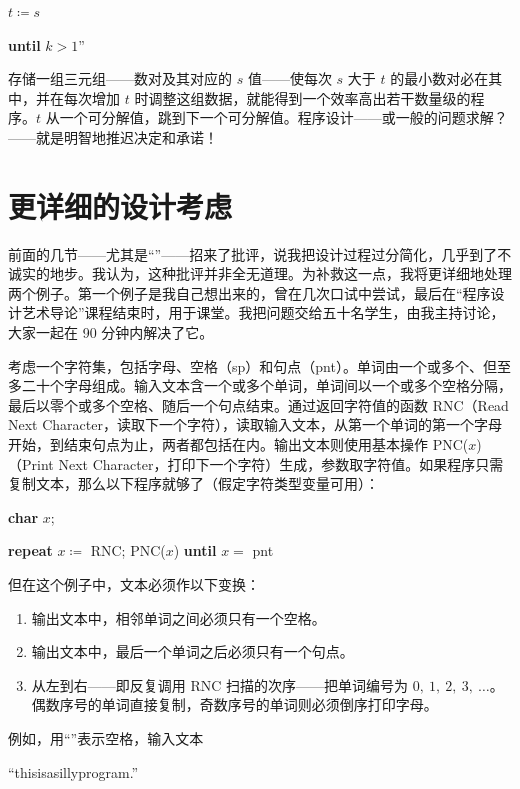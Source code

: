 \documentclass[twoside,11pt,fontset=none]{ctexbook}
\begin{document}
\quad \quad $t \coloneq s$

\quad \textbf{until} $k > 1$''

存储一组三元组——数对及其对应的 $s$ 值——使每次 $s$ 大于 $t$ 的最小数对必在其中，并在每次增加 $t$ 时调整这组数据，就能得到一个效率高出若干数量级的程序。$t$ 从一个可分解值，跳到下一个可分解值。程序设计——或一般的问题求解？——就是明智地推迟决定和承诺！

\section[更详细的设计考虑]{更详细的设计考虑}

前面的几节——尤其是“”——招来了批评，说我把设计过程过分简化，几乎到了不诚实的地步。我认为，这种批评并非全无道理。为补救这一点，我将更详细地处理两个例子。第一个例子是我自己想出来的，曾在几次口试中尝试，最后在“程序设计艺术导论”课程结束时，用于课堂。我把问题交给五十名学生，由我主持讨论，大家一起在 90 分钟内解决了它。

考虑一个字符集，包括字母、空格（sp）和句点（pnt）。单词由一个或多个、但至多二十个字母组成。输入文本含一个或多个单词，单词间以一个或多个空格分隔，最后以零个或多个空格、随后一个句点结束。通过返回字符值的函数 RNC（Read Next Character，读取下一个字符），读取输入文本，从第一个单词的第一个字母开始，到结束句点为止，两者都包括在内。输出文本则使用基本操作 PNC($x$)（Print Next Character，打印下一个字符）生成，参数取字符值。如果程序只需复制文本，那么以下程序就够了（假定字符类型变量可用）：

\quad \textbf{char} $x$;

\quad \textbf{repeat} $x \coloneq$ RNC; PNC($x$) \textbf{until} $x =$ pnt

但在这个例子中，文本必须作以下变换：

\begin{enumerate}[wide, nosep, label=(\arabic*)]
	\item 输出文本中，相邻单词之间必须只有一个空格。
	\item 输出文本中，最后一个单词之后必须只有一个句点。
	\item 从左到右——即反复调用 RNC 扫描的次序——把单词编号为 $0,\ 1,\ 2,\ 3,\ \dots$。偶数序号的单词直接复制，奇数序号的单词则必须倒序打印字母。
\end{enumerate}

例如，用“\textendash”表示空格，输入文本

\quad ``this\textemdash{}is\textemdash{}a\textemdash{}silly\textemdash{}program\textemdash{}.''
\end{document}
